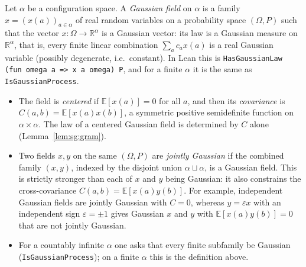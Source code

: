 \begin{definition}\label{def:sg:gaussianfield}
Let $\alpha$ be a configuration space. A \emph{Gaussian field} on $\alpha$ is a family $x=(x(a))_{a\in\alpha}$ of real random
variables on a probability space $(\Omega,P)$ such that the vector $x:\Omega\to\mathbb R^\alpha$ is a Gaussian vector: its law is
a Gaussian measure on $\mathbb R^\alpha$, that is, every finite linear combination $\sum_ac_ax(a)$ is a real Gaussian variable
(possibly degenerate, i.e.\ constant). In Lean this is \texttt{HasGaussianLaw (fun omega a => x a omega) P}, and for a finite
$\alpha$ it is the same as \texttt{IsGaussianProcess}.
\begin{itemize}
\item The field is \emph{centered} if $\mathbb E[x(a)]=0$ for all $a$, and then its \emph{covariance} is
  $C(a,b)=\mathbb E[x(a)x(b)]$, a symmetric positive semidefinite function on $\alpha\times\alpha$. The law of a centered Gaussian field
  is determined by $C$ alone (Lemma~\ref{lem:sg:gram}).
\item Two fields $x,y$ on the same $(\Omega,P)$ are \emph{jointly Gaussian} if the combined family $(x,y)$, indexed by the
  disjoint union $\alpha\sqcup\alpha$, is a Gaussian field. This is strictly stronger than each of $x$ and $y$ being Gaussian: it
  also constrains the cross-covariance $C(a,b)=\mathbb E[x(a)y(b)]$. For example, independent Gaussian fields are jointly Gaussian
  with $C=0$, whereas $y=\varepsilon x$ with an independent sign $\varepsilon=\pm1$ gives Gaussian $x$ and $y$ with
  $\mathbb E[x(a)y(b)]=0$ that are not jointly Gaussian.
\item For a countably infinite $\alpha$ one asks that every finite subfamily be Gaussian (\texttt{IsGaussianProcess}); on a finite
  $\alpha$ this is the definition above.
\end{itemize}
\end{definition}

